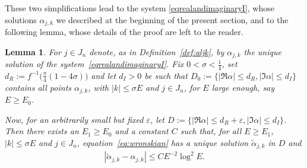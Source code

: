 \documentclass[pdftex]{sigma}
\numberwithin{equation}{section}
\newtheorem{lem}[thm]{Lemma}
\newcommand{\e}{\varepsilon}
\newcommand{\al}{\alpha}
\begin{document}
These two simplif\/ications lead to the system \eqref{eqrealandimaginaryI}, whose solutions $\al_{j,k}$ we described at the beginning of the present
section,
and to the following lemma, whose details of the proof are left to the reader.

\begin{lem}\label{lem:system} For $j\in J_n$ denote, as in Definition~{\rm \ref{def:aljk}}, by $\al_{j,k}$ the unique solution of the system~\eqref{eqrealandimaginaryI}.	 Fix $0<\sigma<\frac14$, set $d_R:=f^{-1}\big(\frac{\pi}{4}(1-4 \sigma)\big)$ and let $d_I>0$ be such that
$D_0:=\{|\Re{\al}|\leq d_R,|\Im{\al}|\leq d_I\}$ contains all points $\al_{j,k}$, with $|k| \leq \sigma E$ and $j\in J_n$, for $E$ large enough, say $E\geq E_0$.
	
Now, for an arbitrarily small but fixed $\e$, let $D:=\{|\Re{\al}|\leq d_R+\e,|\Im{\al}|\leq d_I\}$. Then there exists an $E_1\geq E_0$ and a constant $C$ such that, for all $E\geq E_1$, $|k| \leq \sigma E$ and $j\in J_n$, equation~\eqref{eq:wronskian} has a unique solution $\tilde{\al}_{j,k}$ in $D$ and
	\begin{gather*}
	|\tilde{\al}_{j,k}- \al_{j,k}|\leq C E^{-2} \log^2 E .
	\end{gather*}
\end{lem}
\end{document}
